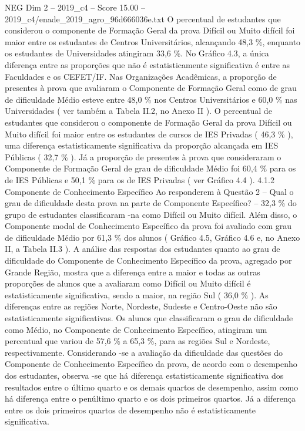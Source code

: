 \begin{textsample}{NEG Dim 2 – 2019\_c4 – Score 15.00 – 2019\_c4/enade\_2019\_agro\_96d666036e.txt}
O percentual de estudantes que considerou o componente de Formação Geral da prova Difícil ou Muito difícil foi maior entre os estudantes de Centros Universitários, alcançando 48,3 \%, enquanto os estudantes de Universidades atingiram 33,6 \%.
No Gráfico 4.3, a única diferença entre as proporções que não é estatisticamente significativa é entre as Faculdades e os CEFET/IF.
Nas Organizações Acadêmicas, a proporção de presentes à prova que avaliaram o Componente de Formação Geral como de grau de dificuldade Médio esteve entre 48,0 \% nos Centros Universitários e 60,0 \% nas Universidades ( ver também a Tabela II.2, no Anexo II ).
O percentual de estudantes que considerou o componente de Formação Geral da prova Difícil ou Muito difícil foi maior entre os estudantes de cursos de IES Privadas ( 46,3 \% ), uma diferença estatisticamente significativa da proporção alcançada em IES Públicas ( 32,7 \% ).
Já a proporção de presentes à prova que consideraram o Componente de Formação Geral de grau de dificuldade Médio foi 60,4 \% para os de IES Públicas e 50,1 \% para os de IES Privadas ( ver Gráfico 4.4 ). 4.1.2 Componente de Conhecimento Específico Ao responderem à Questão 2 – Qual o grau de dificuldade desta prova na parte de Componente Específico? – 32,3 \% do grupo de estudantes classificaram -na como Difícil ou Muito difícil.
Além disso, o Componente modal de Conhecimento Específico da prova foi avaliado com grau de dificuldade Médio por 61,3 \% dos alunos ( Gráfico 4.5, Gráfico 4.6 e, no Anexo II, a Tabela II.3 ).
A análise das respostas dos estudantes quanto ao grau de dificuldade do Componente de Conhecimento Específico da prova, agregado por Grande Região, mostra que a diferença entre a maior e todas as outras proporções de alunos que a avaliaram como Difícil ou Muito difícil é estatisticamente significativa, sendo a maior, na região Sul ( 36,0 \% ).
As diferenças entre as regiões Norte, Nordeste, Sudeste e Centro-Oeste não são estatisticamente significativas.
Os alunos que classificaram o grau de dificuldade como Médio, no Componente de Conhecimento Específico, atingiram um percentual que variou de 57,6 \% a 65,3 \%, para as regiões Sul e Nordeste, respectivamente.
Considerando -se a avaliação da dificuldade das questões do Componente de Conhecimento Específico da prova, de acordo com o desempenho dos estudantes, observa -se que há diferença estatisticamente significativa dos resultados entre o último quarto e os demais quartos de desempenho, assim como há diferença entre o penúltimo quarto e os dois primeiros quartos.
Já a diferença entre os dois primeiros quartos de desempenho não é estatisticamente significativa.

\end{textsample}
